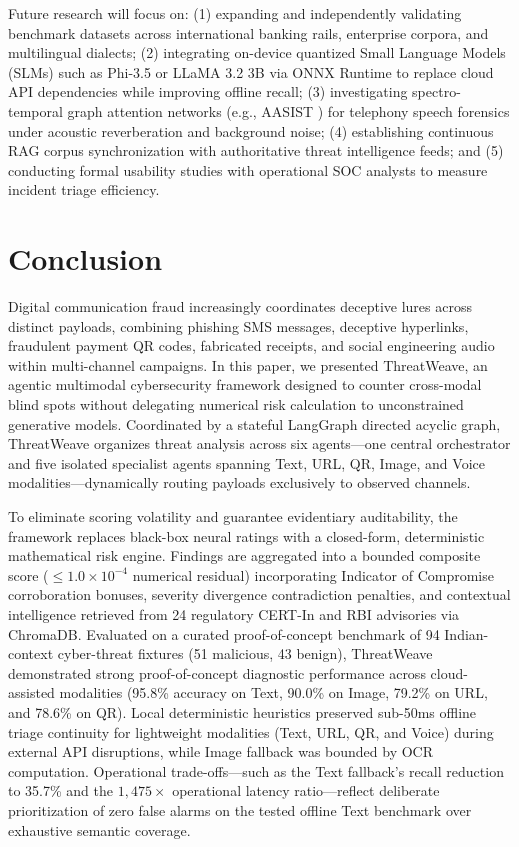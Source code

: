 \documentclass[conference]{IEEEtran}
\begin{document}
Future research will focus on: (1) expanding and independently validating benchmark datasets across international banking rails, enterprise corpora, and multilingual dialects; (2) integrating on-device quantized Small Language Models (SLMs) such as Phi-3.5 or LLaMA 3.2 3B via ONNX Runtime to replace cloud API dependencies while improving offline recall; (3) investigating spectro-temporal graph attention networks (e.g., AASIST \cite{jung2022aasist}) for telephony speech forensics under acoustic reverberation and background noise; (4) establishing continuous RAG corpus synchronization with authoritative threat intelligence feeds; and (5) conducting formal usability studies with operational SOC analysts to measure incident triage efficiency.

\section{Conclusion}
Digital communication fraud increasingly coordinates deceptive lures across distinct payloads, combining phishing SMS messages, deceptive hyperlinks, fraudulent payment QR codes, fabricated receipts, and social engineering audio within multi-channel campaigns. In this paper, we presented ThreatWeave, an agentic multimodal cybersecurity framework designed to counter cross-modal blind spots without delegating numerical risk calculation to unconstrained generative models. Coordinated by a stateful LangGraph directed acyclic graph, ThreatWeave organizes threat analysis across six agents---one central orchestrator and five isolated specialist agents spanning Text, URL, QR, Image, and Voice modalities---dynamically routing payloads exclusively to observed channels.

To eliminate scoring volatility and guarantee evidentiary auditability, the framework replaces black-box neural ratings with a closed-form, deterministic mathematical risk engine. Findings are aggregated into a bounded composite score ($\le 1.0 \times 10^{-4}$ numerical residual) incorporating Indicator of Compromise corroboration bonuses, severity divergence contradiction penalties, and contextual intelligence retrieved from 24 regulatory CERT-In and RBI advisories via ChromaDB. Evaluated on a curated proof-of-concept benchmark of 94 Indian-context cyber-threat fixtures (51 malicious, 43 benign), ThreatWeave demonstrated strong proof-of-concept diagnostic performance across cloud-assisted modalities (95.8\% accuracy on Text, 90.0\% on Image, 79.2\% on URL, and 78.6\% on QR). Local deterministic heuristics preserved sub-50ms offline triage continuity for lightweight modalities (Text, URL, QR, and Voice) during external API disruptions, while Image fallback was bounded by OCR computation. Operational trade-offs---such as the Text fallback's recall reduction to 35.7\% and the $1,475\times$ operational latency ratio---reflect deliberate prioritization of zero false alarms on the tested offline Text benchmark over exhaustive semantic coverage.
\end{document}
